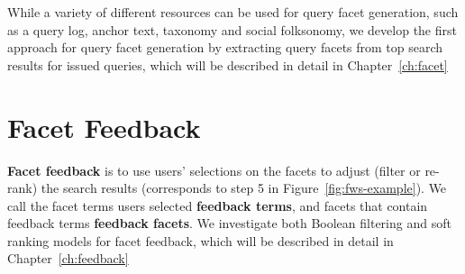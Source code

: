 While a variety of different resources can be used for query facet generation, such as a query log, anchor text, taxonomy and social folksonomy, we develop the first approach for query facet generation by extracting query facets from top search results for issued queries, which will be described in detail in Chapter~\ref{ch:facet}

\section{Facet Feedback}
\textbf{Facet feedback} is to use users' selections on the facets to adjust (filter or re-rank) the search results (corresponds to step 5 in Figure~\ref{fig:fws-example}). We call the facet terms users selected \textbf{feedback terms}, and facets that contain feedback terms \textbf{feedback facets}. We investigate both Boolean filtering and soft ranking models for facet feedback, which will be described in detail in Chapter~\ref{ch:feedback}